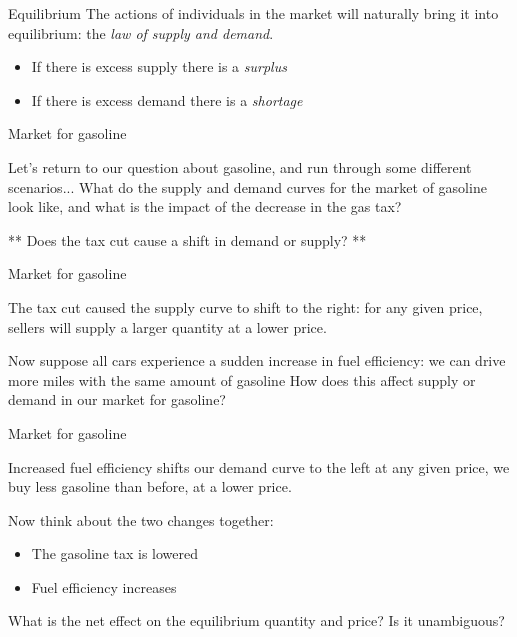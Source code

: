 \documentclass[compress]{beamer}
\begin{document}
\begin{frame}{Equilibrium}
    The actions of individuals in the market will naturally bring it into equilibrium: the \textit{law of supply and demand}.
    \begin{itemize}
        \item If there is excess supply there is a \textit{surplus}
        \item If there is excess demand there is a \textit{shortage}
    \end{itemize}
    \end{frame}
    

\begin{frame}{Market for gasoline}
    \begin{block}{Let's return to our question about gasoline, and run through some different scenarios...}
    What do the supply and demand curves for the market of gasoline look like, and what is the impact of the decrease in the gas tax?
\end{block}
    \begin{center}
        ** Does the tax cut cause a shift in demand or supply? **
    \end{center}
\end{frame}

\begin{frame}{Market for gasoline}
    \begin{block}{The tax cut caused the supply curve to shift to the right: }
        for any given price, sellers will supply a larger quantity at a lower price.
    \end{block}

    \medskip

    \begin{block}{Now suppose all cars experience a sudden increase in fuel efficiency: we can drive more miles with the same amount of gasoline}
        How does this affect supply or demand in our market for gasoline?
\end{block}
\end{frame}


\begin{frame}{Market for gasoline}
\begin{block}{ Increased fuel efficiency shifts our demand curve to the left} 
at any given price, we buy less gasoline than before, at a lower price.
\end{block}
    \medskip

   \begin{block}{Now think about the two changes together:}
   \begin{itemize}
       \item The gasoline tax is lowered
       \item Fuel efficiency increases
   \end{itemize}
    What is the net effect on the equilibrium quantity and price? Is it unambiguous?
    \end{block}


\end{frame}
\end{document}
